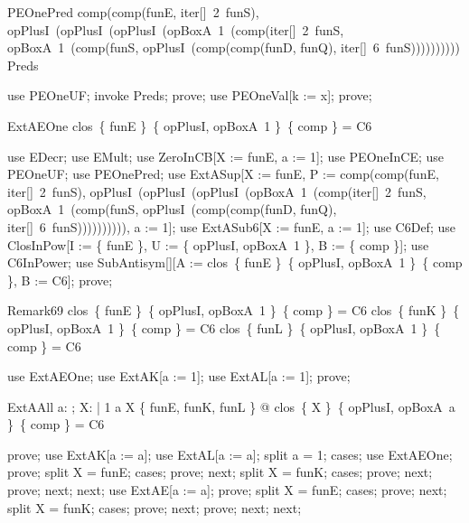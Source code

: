 \documentclass{article}
\begin{document}
\begin{theorem}{PEOnePred}
  comp(comp(funE, iter[\nat]~2~funS), opPlusI~(opPlusI~(opPlusI~(opBoxA~1~(comp(iter[\nat]~2~funS, opBoxA~1~(comp(funS, opPlusI~(comp(comp(funD, funQ), iter[\nat]~6~funS)))))))))) \in Preds
\end{theorem}

\begin{zproof}
use PEOneUF;
invoke Preds;
prove;
use PEOneVal[k := x];
prove;
\end{zproof}

\begin{theorem}{ExtAEOne}
  clos~\{ funE \}~\{ opPlusI, opBoxA~1 \}~\{ comp \} = C6
\end{theorem}

\begin{zproof}
use EDecr;
use EMult;
use ZeroInCB[X := funE, a := 1];
use PEOneInCE;
use PEOneUF;
use PEOnePred;
use ExtASup[X := funE, P := comp(comp(funE, iter[\nat]~2~funS), opPlusI~(opPlusI~(opPlusI~(opBoxA~1~(comp(iter[\nat]~2~funS, opBoxA~1~(comp(funS, opPlusI~(comp(comp(funD, funQ), iter[\nat]~6~funS)))))))))), a := 1];
use ExtASub6[X := funE, a := 1];
use C6Def;
use ClosInPow[I := \{ funE \}, U := \{ opPlusI, opBoxA~1 \}, B := \{ comp \}];
use C6InPower;
use SubAntisym[\nat \fun \nat][A := clos~\{ funE \}~\{ opPlusI, opBoxA~1 \}~\{ comp \}, B := C6];
prove;
\end{zproof}

\begin{theorem}{Remark69}
  clos~\{ funE \}~\{ opPlusI, opBoxA~1 \}~\{ comp \} = C6 \land clos~\{ funK \}~\{ opPlusI, opBoxA~1 \}~\{ comp \} = C6 \land clos~\{ funL \}~\{ opPlusI, opBoxA~1 \}~\{ comp \} = C6
\end{theorem}

\begin{zproof}
use ExtAEOne;
use ExtAK[a := 1];
use ExtAL[a := 1];
prove;
\end{zproof}

\begin{theorem}{ExtAAll}
  \forall a: \nat; X: \nat \fun \nat | 1 \leq a \land X \in \{ funE, funK, funL \} @ clos~\{ X \}~\{ opPlusI, opBoxA~a \}~\{ comp \} = C6
\end{theorem}

\begin{zproof}
prove;
use ExtAK[a := a];
use ExtAL[a := a];
split a = 1;
cases;
use ExtAEOne;
prove;
split X = funE;
cases;
prove;
next;
split X = funK;
cases;
prove;
next;
prove;
next;
next;
use ExtAE[a := a];
prove;
split X = funE;
cases;
prove;
next;
split X = funK;
cases;
prove;
next;
prove;
next;
next;
\end{zproof}
\end{document}
